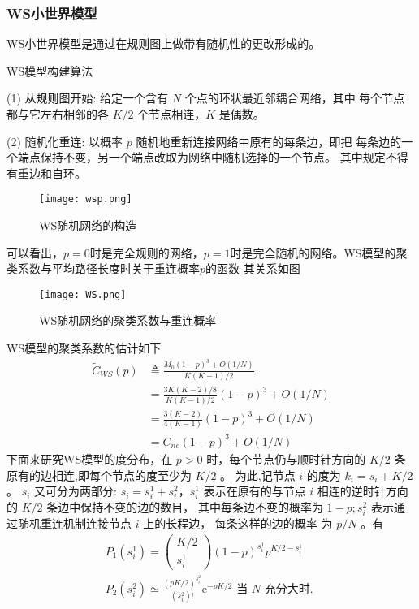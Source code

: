 \subsubsection{WS小世界模型}
WS小世界模型是通过在规则图上做带有随机性的更改形成的。\par
\noindent WS模型构建算法\par
\noindent(1) 从规则图开始: 给定一个含有 $N$ 个点的环状最近邻耦合网络，其中 每个节点都与它左右相邻的各 $K / 2$ 个节点相连，$K$ 是偶数。\par
\noindent(2) 随机化重连: 以概率 $p$ 随机地重新连接网络中原有的每条边，即把 每条边的一个端点保持不变，另一个端点改取为网络中随机选择的一个节点。
其中规定不得有重边和自环。\par
\begin{figure}[!htbp]
    \centering
    \texttt{[image: wsp.png]}
    \caption{WS随机网络的构造}
\end{figure}
可以看出，$p=0$时是完全规则的网络，$p=1$时是完全随机的网络。WS模型的聚类系数与平均路径长度时关于重连概率$p$的函数
其关系如图
\begin{figure}[!htbp]
    \centering
    \texttt{[image: WS.png]}
    \caption{WS随机网络的聚类系数与重连概率}
\end{figure}
WS模型的聚类系数的估计如下
\begin{equation}
    \begin{aligned}
    \tilde{C}_{W S}(p) & \triangleq \frac{M_0(1-p)^3+O(1 / N)}{K(K-1) / 2} \\
    & =\frac{3 K(K-2) / 8}{K(K-1) / 2}(1-p)^3+O(1 / N) \\
    & =\frac{3(K-2)}{4(K-1)}(1-p)^3+O(1 / N) \\
    & =C_{n c}(1-p)^3+O(1 / N)
    \end{aligned}
\end{equation}
下面来研究WS模型的度分布，在 $p>0$ 时，每个节点仍与顺时针方向的 $K / 2$ 条原有的边相连,即每个节点的度至少为 $K / 2$ 。
 为此,记节点 $i$ 的度为 $k_i=s_i+K / 2$。 $s_i$ 又可分为两部分: 
 $s_i=s_i^1+s_i^2$，$s_i^1$ 表示在原有的与节点 $i$ 相连的逆时针方向的 $K / 2$ 条边中保持不变的边的数目，
 其中每条边不变的概率为 $1-p ; s_i^2$ 表示通过随机重连机制连接节点 $i$ 上的长程边，
 每条这样的边的概率 为 $p / N$ 。有
 \begin{equation}
    \begin{gathered}
    P_1\left(s_i^1\right)=\left(\begin{array}{c}
    K / 2 \\
    s_i^1
    \end{array}\right)(1-p)^{s_i^{1}} p^{K / 2-s_i^1}\\
    P_2\left(s_i^2\right) \simeq \frac{(p K / 2)^{s_i^2}}{\left(s_i^2\right) !} \mathrm{e}^{-\rho K / 2}\text { 当 } N \text { 充分大时. }
    \end{gathered}
\end{equation}
